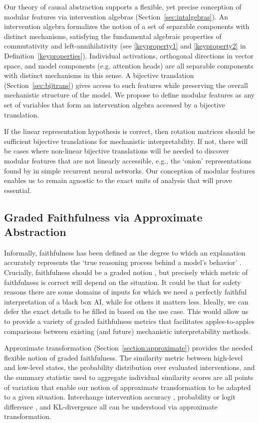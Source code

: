 \documentclass[twoside,11pt]{article}
\begin{document}
Our theory of causal abstraction supports a flexible, yet precise conception of modular features via intervention algebras (Section~\ref{sec:intalgebras}). An intervention algebra formalizes the notion of a set of separable components with distinct mechanisms, satisfying the fundamental algebraic properties of commutativity and left-annihilativity (see \ref{keyproperty1} and \ref{keyproperty2} in Definition~\ref{keyproperties}). Individual activations, orthogonal directions in vector space, and model components (e.g. attention heads) are all separable components with distinct mechanisms in this sense. %
A bijective translation (Section~\ref{sec:bijtrans}) gives access to such features while preserving the overall mechanistic structure of the model. We propose to define modular features as any set of variables that form an intervention algebra accessed by a bijective translation. 

If the linear representation hypothesis is correct, then rotation matrices should be sufficient bijective translations for mechanistic interpretability. If not, there will be cases where non-linear bijective translations will be needed to discover modular features that are not linearly accessible, e.g., the `onion' representations found by \cite{csordas2024recurrent} in simple recurrent neural networks. Our conception of modular features enables us to remain agnostic to the exact units of analysis that will prove essential.


\subsection{Graded Faithfulness via Approximate Abstraction}
Informally, faithfulness has been defined as the degree to which an explanation accurately represents the `true reasoning process behind a model’s behavior' \citep{notnotAttention, Jacovi2020, Lyu, FaithfulnessCompare}. Crucially, faithfulness should be a graded notion \citep{Jacovi2020}, but precisely which metric of faithfulness is correct will depend on the situation. It could be that for safety reasons there are some domains of inputs for which we need a perfectly faithful interpretation of a black box AI, while for others it matters less. Ideally, we can defer the exact details to be filled in based on the use case. %
This would allow us to provide a variety of graded faithfulness metrics that facilitates apples-to-apples comparisons between existing (and future) mechanistic interpretability methods.

Approximate transformation (Section~\ref{section:approximate}) provides the needed flexible notion of graded faithfulness. The similarity metric between high-level and low-level states, the probability distribution over evaluated interventions, and the summary statistic used to aggregate individual similarity scores are all points of variation that enable our notion of approximate transformation to be adapted to a given situation. Interchange intervention accuracy \citep{geiger-etal-2021-iit, Geiger-etal:2023:DAS, Wu:Geiger:2023:BDAS}, probability or logit difference \citep{Meng:2022,chan2022causal,wang2023interpretability,zhang2024towards}, and KL-divergence all can be understood via approximate transformation.
\end{document}
